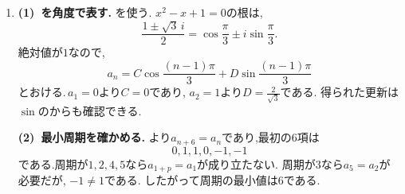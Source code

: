 \begin{enumerate}[label=\textbf{問\arabic*.},leftmargin=3.8em,format=\bookitemlink{practice-special}{solution}{problem}]
                \smallskip
                \textbf{(2)~右辺を作るを引く.}
                $\displaystyle 3^{n-1}$に同じ組合せを施すと,
                \[
                  3^{n+1}-3\cdot3^n+2\cdot3^{n-1}=2\cdot3^{n-1}.
                \]
                そこで$\displaystyle b_n=a_n-3^{n-1}$とおけば,
                \[
                  b_{n+2}-3b_{n+1}+2b_n=0.
                \]
                は$\displaystyle 1,2$だから$\displaystyle b_n=A+B2^{n-1}$とおける.
                $\displaystyle b_1=2,b_2=3$から$\displaystyle A=B=1$となり,
                \[
                  a_n=1+2^{n-1}+3^{n-1}
                \]
                を得る.4項間を3項間へ,さらに既習の解法へ順に帰着させた.
          \item \textbf{(1)~を角度で表す.}
                を使う.
                $\displaystyle x^2-x+1=0$の根は,
                \[
                  \frac{1\pm\sqrt3\,i}{2}
                   =\cos\frac\pi3\pm i\sin\frac\pi3.
                \]
                絶対値が$\displaystyle 1$なので,
                \[
                  a_n=C\cos\frac{(n-1)\pi}{3}
                      +D\sin\frac{(n-1)\pi}{3}
                \]
                とおける.\,$\displaystyle a_1=0$より$\displaystyle C=0$であり,
                $\displaystyle a_2=1$より$\displaystyle D=\frac2{\sqrt3}$である.
                得られた更新は$\sin$のからも確認できる.

                \smallskip
                \textbf{(2)~最小周期を確かめる.}
                より$\displaystyle a_{n+6}=a_n$であり,最初の6項は
                \[
                  0,1,1,0,-1,-1
                \]
                である.周期が$\displaystyle 1,2,4,5$なら$\displaystyle a_{1+p}=a_1$が成り立たない.
                周期が$\displaystyle 3$なら$\displaystyle a_5=a_2$が必要だが,
                $\displaystyle -1\ne1$である.
                したがって周期の最小値は$\displaystyle 6$である.


\end{enumerate}

